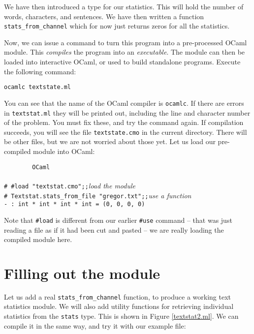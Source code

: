 \documentclass[]{book}
\newcommand{\smspace}{\vspace{4mm}}
\begin{document}
We have then introduced a type for our statistics. This will hold the number of words, characters, and sentences. We have then written a function \texttt{stats\_from\_channel} which for now just returns zeros for all the statistics.

Now, we can issue a command to turn this program into a pre-processed OCaml module. This \textit{compiles} the program into an \textit{executable}. The module can then be loaded into interactive OCaml, or used to build standalone programs. Execute the following command:

\smspace
\texttt{ocamlc textstate.ml}
\smspace

\noindent You can see that the name of the OCaml compiler is \texttt{ocamlc}. If there are errors in \texttt{textstat.ml} they will be printed out, including the line and character number of the problem. You must fix these, and try the command again. If compilation succeeds, you will see the file \texttt{textstate.cmo} in the current directory. There will be other files, but we are not worried about those yet. Let us load our pre-compiled module into OCaml:

\smspace
\noindent\verb!        OCaml!\\
\noindent\\
\noindent\texttt{\# \#load "textstat.cmo";;}\hfill\textit{load the module}\\
\noindent\texttt{\# Textstat.stats\_from\_file "gregor.txt";;}\hfill\textit{use a function}\\
\noindent\texttt{- :\ int * int * int * int = (0, 0, 0, 0)}\hfill\vphantom{g}
\smspace

\noindent Note that \texttt{\#load} is different from our earlier \texttt{\#use} command -- that was just reading a file as if it had been cut and pasted -- we are really loading the compiled module here.

\section*{Filling out the module}

Let us add a real \texttt{stats\_from\_channel} function, to produce a working text statistics module. We will also add utility functions for retrieving individual statistics from the \texttt{stats} type. This is shown in Figure \ref{textstat2.ml}. We can compile it in the same way, and try it with our example file:
\end{document}
